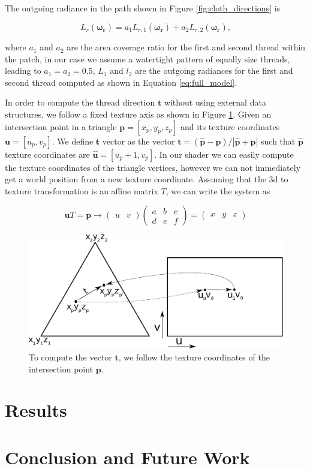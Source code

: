 \documentclass[12pt]{article}
\begin{document}
The outgoing radiance in the path shown in Figure \ref{fig:cloth_directions} is

\begin{equation}
L_r(\boldsymbol{\omega_r}) = a_1 L_{r,1}(\boldsymbol{\omega_r}) + a_2 L_{r,2}(\boldsymbol{\omega_r}),
\end{equation}

where $a_1$ and $a_2$ are the area coverage ratio for the first and second thread within the patch, in our case we assume a watertight pattern of equally size threads, leading to $a_1 = a_2 = 0.5$, $L_1$ and $l_2$ are the outgoing radiances for the first and second thread computed as shown in Equation \ref{eq:full_model}.

In order to compute the thread direction $\mathbf{t}$ without using external data structures, we follow a fixed texture axis as shown in Figure \ref{fig:thread_uv_coord}.
Given an intersection point in a triangle $\mathbf{p} = \left[ x_p, y_p,z_p \right]$ and its texture coordinates $\mathbf{u} = \left[ u_p, v_p \right]$.
We define $\mathbf{t}$ vector as the vector $\mathbf{t} = (\hat{\mathbf{p}} - \mathbf{p})/ \left|\hat{\mathbf{p}} + \mathbf{p} \right|$ such that $\hat{\mathbf{p}}$ texture coordinates are $\hat{\mathbf{u}} = \left[ u_p + 1, v_p \right]$.
In our shader we can easily compute the texture coordinates of the triangle vertices, however we can not immediately get a world position from a new texture coordinate.
Assuming that the 3d to texture transformation is an affine matrix $T$, we can write the system as

\begin{equation}
\mathbf{u} T = \mathbf{p} \rightarrow
\begin{pmatrix}
u & v
\end{pmatrix}
\begin{pmatrix}
a & b & c \\
d & e & f
\end{pmatrix} =
\begin{pmatrix}
x & y & z
\end{pmatrix}
\end{equation}

\begin{figure}[ht!]
\centering
\includegraphics[width=\textwidth]{images/thread_3d_coord}
	\caption{To compute the vector $\mathbf{t}$, we follow the texture coordinates of the intersection point $\mathbf{p}$.}
	\label{fig:thread_uv_coord}
\end{figure}

\section{Results}

\section{Conclusion and Future Work}



\end{document}

